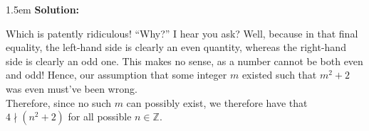 \documentclass{article}
\newenvironment{solution}{
	\vspace{.5em}
	\par
	\begin{adjustwidth}{1.5em}{}
	\textbf{{Solution:}}
	\par
	\vspace{.5em}
}{
	\vspace{1em}
	\end{adjustwidth}
	\setcounter{step}{0}
}
\newcounter{step}
\begin{document}
\begin{solution}
	Which is patently ridiculous! ``Why?'' I hear you ask? Well, because in that final equality, the left-hand side is clearly an even quantity, whereas the right-hand side is clearly an odd one. This makes no sense, as a number cannot be both even and odd! Hence, our assumption that some integer $m$ existed such that $m^{2} + 2$ was even must've been wrong. \\

	Therefore, since no such $m$ can possibly exist, we therefore have that $4 \nmid \left(n^{2} + 2 \right)$ for all possible $n \in \mathbb{Z}$.
\end{solution}


\ifdefined\iscombined
	\newpage
\else
	
\end{document}
